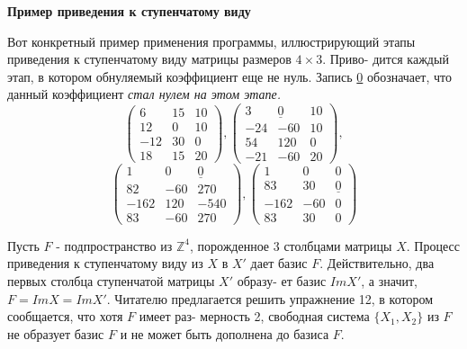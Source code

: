 	\noindent
	{\bf Пример приведения к ступенчатому виду}
	
	Вот конкретный пример применения программы, иллюстрирующий\linebreak
	этапы приведения к ступенчатому виду матрицы размеров $4\times 3$. Приво-\linebreak
	дится каждый этап, в котором обнуляемый коэффициент еще не нуль.\linebreak
	Запись \underline{0} обозначает, что данный коэффициент {\it стал нулем на этом\linebreak
	этапе.}
	$$\begin{pmatrix} 6 & 15 & 10 \\ 12 & 0 & 10 \\ -12 & 30 & 0 \\ 18 & 15 & 20\end{pmatrix}, \begin{pmatrix} 3 & \underline{0} & 10 \\ -24 & -60 & 10 \\ 54 & 120 & 0 \\ -21 & -60 & 20\end{pmatrix},$$
	$$\begin{pmatrix} 1 & 0 & \underline{0} \\ 82 & -60 & 270 \\ -162 & 120 & -540 \\ 83 & -60 & 270\end{pmatrix}, \begin{pmatrix} 1 & 0 & 0 \\ 83 & 30 & \underline{0} \\ -162 & -60 & 0 \\ 83 & 30 & 0\end{pmatrix}$$
	
	Пусть $F$ - подпространство из ${\mathbb Z}^4$, порожденное 3 столбцами матрицы\linebreak
	$X$. Процесс приведения к ступенчатому виду из $X$ в $X'$ дает базис $F$.\linebreak
	Действительно, два первых столбца ступенчатой матрицы $X'$ образу-\linebreak
	ет базис $ImX'$, а значит, $F = ImX = ImX'$. Читателю предлагается\linebreak
	решить упражнение 12, в котором сообщается, что хотя $F$ имеет раз-\linebreak
	мерность 2, свободная система $\{X_1, X_2\}$ из $F$ не образует базис $F$ и не\linebreak
	может быть дополнена до базиса $F$.
	
